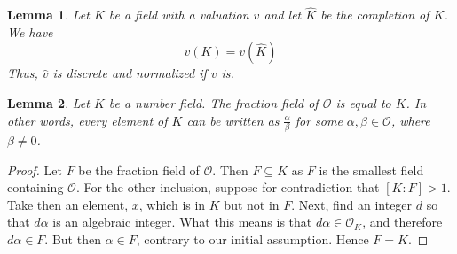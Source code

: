 \documentclass{article}
\newtheorem{lemma}{Lemma}[section]
\newcommand{\mcal}[1]{\mathcal{#1}}
\begin{document}

\begin{lemma} \label{lem: Image of valuation and completed valuation are the same}
    Let $K$ be a field with a valuation $v$ and let $\hat K$ be the completion of $K$. We have 
    $$v(K) = v(\hat K)$$
    Thus, $\hat v$ is discrete and normalized if $v$ is.
\end{lemma}


\begin{lemma} \label{lem: Fraction field of ring of integers is number field}
    Let $K$ be a number field. The fraction field of $\mcal O$ is equal to $K$. In other words, every element of $K$ can be written as $\frac{\alpha}{\beta}$ for some $\alpha, \beta \in \mcal O$, where $\beta \neq 0$.
\end{lemma}
\begin{proof}
    Let $F$ be the fraction field of $\mcal O$. Then $F \subseteq K$ as $F$ is the smallest field containing $\mcal O$. For the other inclusion, suppose for contradiction that $[K : F] > 1$. Take then an element, $x$, which is in $K$ but not in $F$. Next, find an integer $d$ so that $d \alpha$ is an algebraic integer. What this means is that $d \alpha \in \mcal O_K$, and therefore $d \alpha \in F$. But then $\alpha \in F$, contrary to our initial assumption. Hence $F = K$.
\end{proof}
\end{document}
